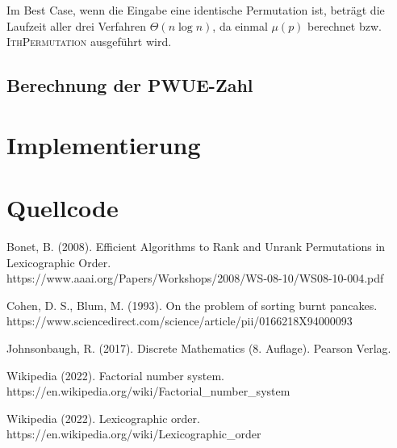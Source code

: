 \documentclass[a4paper, 11pt, ngerman]{article}
\begin{document}
Im Best Case, wenn die Eingabe eine identische Permutation ist, beträgt die Laufzeit aller drei Verfahren $\Theta(n \log n)$, da einmal $\mu(p)$ berechnet bzw. \textsc{IthPermutation} ausgeführt wird.

\subsection{Berechnung der PWUE-Zahl}

\section{Implementierung}

\section{Quellcode}

\begin{thebibliography}{5}
    Bonet, B. (2008).
    Efficient Algorithms to Rank and Unrank Permutations in Lexicographic Order. \\
    https://www.aaai.org/Papers/Workshops/2008/WS-08-10/WS08-10-004.pdf

    Cohen, D. S., Blum, M. (1993).
    On the problem of sorting burnt pancakes. \\
    https://www.sciencedirect.com/science/article/pii/0166218X94000093

    Johnsonbaugh, R. (2017).
    Discrete Mathematics (8. Auflage).
    Pearson Verlag.

    Wikipedia (2022).
    Factorial number system. \\
    https://en.wikipedia.org/wiki/Factorial\_number\_system

    Wikipedia (2022).
    Lexicographic order. \\
    https://en.wikipedia.org/wiki/Lexicographic\_order
\end{thebibliography}
\end{document}
